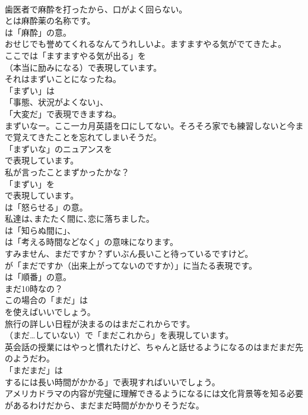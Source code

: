 \documentclass[8pt]{extreport}
\begin{document}
\begin{CJK}{UTF8}{min}
\\	歯医者で麻酔を打ったから、口がよく回らない。 
\\	とは麻酔薬の名称です。
\\	は「麻酔」の意。	
\\	おせじでも誉めてくれるなんてうれしいよ。ますますやる気がでてきたよ。 
\\	ここでは「ますますやる気が出る」を
\\	（本当に励みになる）で表現しています。	
\\	それはまずいことになったね。 
\\	「まずい」は
\\	「事態、状況がよくない」、
\\	「大変だ」で表現できますね。	
\\	まずいなー。ここ一カ月英語を口にしてない。そろそろ家でも練習しないと今まで覚えてきたことを忘れてしまいそうだ。 
\\	「まずいな」のニュアンスを 
\\	で表現しています。	
\\	私が言ったことまずかったかな？ 
\\	「まずい」を 
\\	で表現しています。
\\	は「怒らせる」の意。	
\\	私達は､またたく間に､恋に落ちました。 
\\	は「知らぬ間に」、
\\	は「考える時間などなく」の意味になります。	
\\	すみません、まだですか？ずいぶん長いこと待っているですけど。 
\\	が「まだですか（出来上がってないのですか）」に当たる表現です。
\\	は「順番」の意。	
\\	まだ10時なの？ 
\\	この場合の「まだ」は 
\\	を使えばいいでしょう。	
\\	旅行の詳しい日程が決まるのはまだこれからです。 
\\	（まだ…していない）で「まだこれから」を表現しています。	
\\	英会話の授業にはやっと慣れたけど、ちゃんと話せるようになるのはまだまだ先のようだわ。 
\\	「まだまだ」は
\\	するには長い時間がかかる」で表現すればいいでしょう。	
\\	アメリカドラマの内容が完璧に理解できるようになるには文化背景等を知る必要があるわけだから、まだまだ時間がかかりそうだな。 

\end{CJK}
\end{document}
